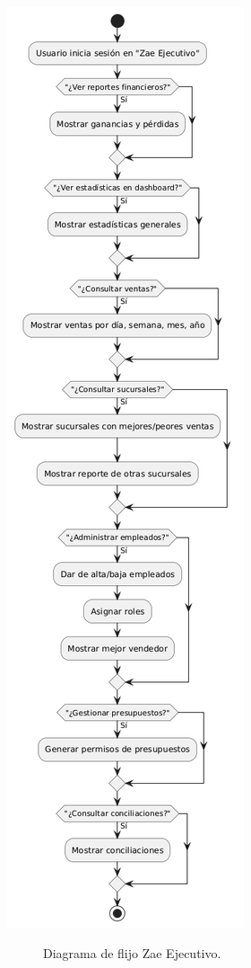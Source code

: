 \documentclass[protocolo.tex]{subfiles}
\begin{document}
\begin{center}
\includegraphics[scale=0.4]{Imagenes/zaeEjecutivo.png}
\end{center}
\begin{figure}[h]  %
    \centering
    \caption{Diagrama de flijo Zae Ejecutivo.}
    \label{fig:mi-figura7}
\end{figure}
\end{document}
